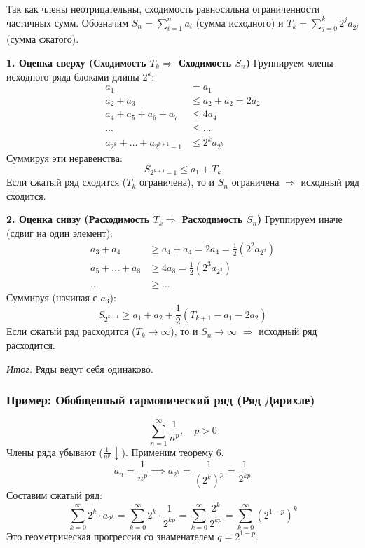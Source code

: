 \begin{tcolorbox}[title=Доказательство]
    Так как члены неотрицательны, сходимость равносильна ограниченности частичных сумм.
    Обозначим $S_n = \sum_{i=1}^n a_i$ (сумма исходного) и $T_k = \sum_{j=0}^k 2^j a_{2^j}$ (сумма сжатого).

    \textbf{1. Оценка сверху (Сходимость $T_k \Rightarrow$ Сходимость $S_n$)}
    Группируем члены исходного ряда блоками длины $2^k$:
    \[
    \begin{aligned}
        a_1 &= a_1 \\
        a_2 + a_3 &\leq a_2 + a_2 = 2a_2 \\
        a_4 + a_5 + a_6 + a_7 &\leq 4a_4 \\
        \dots &\leq \dots \\
        a_{2^k} + \dots + a_{2^{k+1}-1} &\leq 2^k a_{2^k}
    \end{aligned}
    \]
    Суммируя эти неравенства:
    \[ S_{2^{k+1}-1} \leq a_1 + T_k \]
    Если сжатый ряд сходится ($T_k$ ограничена), то и $S_n$ ограничена $\Rightarrow$ исходный ряд сходится.

    \textbf{2. Оценка снизу (Расходимость $T_k \Rightarrow$ Расходимость $S_n$)}
    Группируем иначе (сдвиг на один элемент):
    \[
    \begin{aligned}
        a_3 + a_4 &\geq a_4 + a_4 = 2a_4 = \frac{1}{2} (2^2 a_{2^2}) \\
        a_5 + \dots + a_8 &\geq 4a_8 = \frac{1}{2} (2^3 a_{2^3}) \\
        \dots &\geq \dots
    \end{aligned}
    \]
    Суммируя (начиная с $a_3$):
    \[ S_{2^{k+1}} \geq a_1 + a_2 + \frac{1}{2} (T_{k+1} - a_1 - 2a_2) \]
    Если сжатый ряд расходится ($T_k \to \infty$), то и $S_n \to \infty$ $\Rightarrow$ исходный ряд расходится.
    
    \textit{Итог:} Ряды ведут себя одинаково.
\end{tcolorbox}

\subsubsection*{Пример: Обобщенный гармонический ряд (Ряд Дирихле)}
\[ \sum_{n=1}^{\infty} \frac{1}{n^p}, \quad p > 0 \]
Члены ряда убывают ($ \frac{1}{n^p} \downarrow $). Применим теорему 6.
\[ a_n = \frac{1}{n^p} \implies a_{2^k} = \frac{1}{(2^k)^p} = \frac{1}{2^{kp}} \]
Составим сжатый ряд:
\[ \sum_{k=0}^{\infty} 2^k \cdot a_{2^k} = \sum_{k=0}^{\infty} 2^k \cdot \frac{1}{2^{kp}} = \sum_{k=0}^{\infty} \frac{2^k}{2^{kp}} = \sum_{k=0}^{\infty} \left( 2^{1-p} \right)^k \]
Это геометрическая прогрессия со знаменателем $q = 2^{1-p}$.

